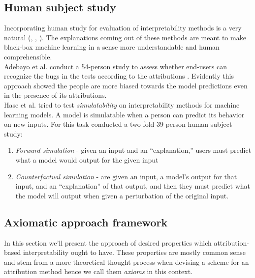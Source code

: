 \documentclass[12pt]{report}
\begin{document}
\newpage


\subsection{Human subject study}

Incorporating  human study for evaluation of interpretability  methods is a very natural (\cite{DBLP:journals/corr/abs-2011-05429}, \cite{DBLP:journals/corr/abs-2005-01831}, \cite{DBLP:journals/corr/RibeiroSG16}).  The explanations coming out of these methods are meant to make black-box machine learning in a sense more understandable and human comprehensible. \\

Adebayo et al. \cite{DBLP:journals/corr/abs-2011-05429} conduct a 54-person study to assess whether end-users can recognize the bugs in the tests according to the attributions . Evidently this approach showed the people are more biased towards the model predictions even in the presence of its attributions. \\

Hase et al. \cite{DBLP:journals/corr/abs-2005-01831} tried to test \textit{simulatability} on interpretability methods for machine learning models. A model is simulatable when a person can predict
its behavior on new inputs. For this task \cite{DBLP:journals/corr/abs-2005-01831}  conducted a two-fold 39-person human-subject study:
\begin{enumerate}
	\item \textit{Forward simulation} - given an input and an “explanation,” users must predict what a model would output for the given input 
	\item \textit{Counterfactual simulation} - are given an input, a model’s output for that input, and an “explanation” of that output, and then they must predict what the model will output when given a perturbation of the original input.
\end{enumerate}

\newpage
\subsection{Axiomatic approach framework}

In this section we'll present the approach of desired properties which attribution-based interpretability ought to have. These properties are mostly common sense and stem from a more theoretical thought process when devising a scheme for an attribution method hence we call them \textit{axioms} in this context. \\ 
\end{document}
